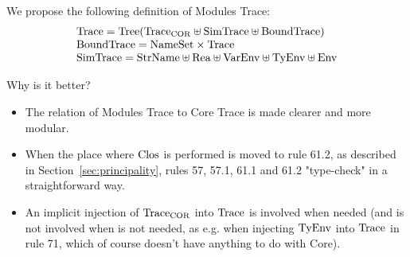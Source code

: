 We propose the following definition of Modules Trace:
\begin{displaymath}
\begin{array}{l}
\mbox{Trace} = \mbox{Tree}(\mbox{Trace}_{\rm COR}\uplus\mbox{SimTrace}\uplus\mbox{BoundTrace})\\
\mbox{BoundTrace}={\rm NameSet}\times\mbox{Trace}\\
\mbox{SimTrace} = {\rm StrName}\uplus\mbox{Rea}\uplus{\rm VarEnv}\uplus{\rm TyEnv}\uplus{\rm Env}\\
\end{array}
\end{displaymath}

Why is it better?
\begin{itemize}
\item 
   The relation of Modules Trace to Core Trace is made clearer
   and more modular. 
\item 
   When the place where ${\rm Clos}$ is performed is moved 
   to rule 61.2, as described in Section~\ref{sec:principality},
   rules 57, 57.1, 61.1 and 61.2 "type-check" in a straightforward way. 
\item 
   An implicit injection of $\mbox{Trace}_{\rm COR}$ into $\mbox{Trace}$
   is involved when needed (and is not involved
   when is not needed, as e.g. when injecting ${\rm TyEnv}$ 
   into $\mbox{Trace}$ in rule 71, which of course doesn't
   have anything to do with Core).
\end{itemize}


